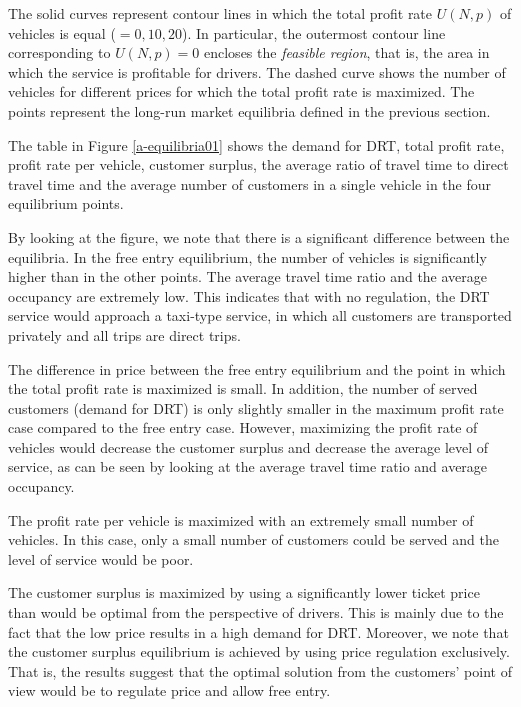 \documentclass[dissertation,draft*]{aaltoseries}
\begin{document}
The solid curves represent contour lines in which the total profit rate $U(N,p)$ of vehicles is equal ($=0,10,20$).
In particular, the outermost contour line corresponding to $U(N,p)=0$ encloses the 
\emph{feasible region}, that is, the area in which the service is profitable for drivers.
The dashed curve shows the number of vehicles for different prices for which
the total profit rate is maximized. The points represent the long-run market equilibria
defined in the previous section.

The table in Figure \ref{a-equilibria01} shows the demand for DRT, total profit rate, profit rate per vehicle, 
customer surplus, the average ratio of travel time to direct travel time
and the average number of customers in a single vehicle in the four equilibrium points.

By looking at the figure, we note that there is a significant difference between the
equilibria. In the free entry equilibrium, the number of vehicles is significantly
higher than in the other points. The average travel time ratio 
and the average occupancy are extremely low. This indicates that with no regulation, the
DRT service would approach a taxi-type service, in which all customers are 
transported privately and all trips are direct trips.

The difference in price between the free entry equilibrium and
the point in which the total profit rate is maximized is small. 
In addition, the number of served customers (demand for DRT)
is only slightly smaller in the maximum profit rate case compared to the free entry case.
However, maximizing the profit rate of vehicles would decrease the 
customer surplus and decrease the average level of service,
as can be seen by looking at the average travel time ratio and average occupancy.

The profit rate per vehicle is maximized with an extremely small number of vehicles.
In this case, only a small number of customers could be served and the level of service
would be poor.

The customer surplus is maximized by using a significantly
lower ticket price than would be optimal from the perspective of drivers. This is mainly due to the 
fact that the low price results in a high demand for DRT. Moreover, we note that the customer surplus
equilibrium is achieved by using price regulation exclusively. That is, the results suggest that 
the optimal solution from the customers' point of view would be to regulate price and allow free 
entry.
\end{document}
